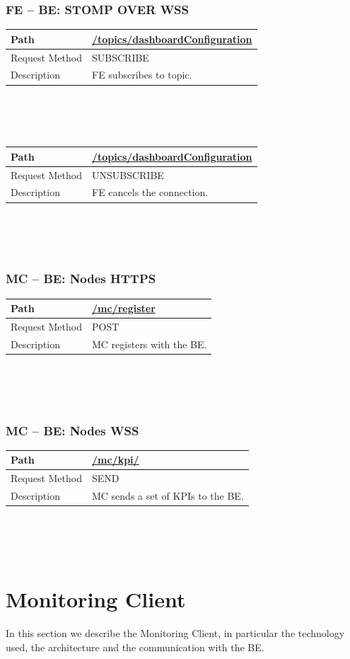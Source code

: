 \documentclass{scrreprt}
\begin{document}
\subsubsection{FE -- BE: STOMP OVER WSS}
\begin{tabularx}{12cm}{l|l}
	Path & \url{/topics/dashboardConfiguration} \\\hline
	Request Method & SUBSCRIBE \\\hline
	Description & FE subscribes to topic.
\end{tabularx}
\\
\\ \\
\begin{tabularx}{12cm}{l|l}
	Path & \url{/topics/dashboardConfiguration} \\\hline
	Request Method & UNSUBSCRIBE \\\hline
	Description & FE cancels the connection. 
\end{tabularx}
\\
\\ \\
\subsubsection{MC -- BE: Nodes HTTPS}
\begin{tabularx}{12cm}{l|l}
	Path & \url{/mc/register} \\\hline
	Request Method & POST \\\hline
	Description & MC registers with the BE. 
\end{tabularx}
\\
\\ \\
\subsubsection{MC -- BE: Nodes WSS}
\begin{tabularx}{12cm}{l|l}
	Path & \url{/mc/kpi/} \\\hline
	Request Method & SEND \\\hline
	Description & MC sends a set of KPIs to the BE. 
\end{tabularx}
\\
\\ \\
\section{Monitoring Client}
In this section we describe the Monitoring Client, in particular the technology used, the architecture and the communication with the BE.
\end{document}

